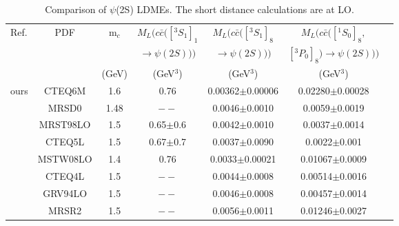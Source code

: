\documentclass[12pt,a4paper,final]{iopart}
\newcommand{\barc}{{\bar{c}}}
\begin{document}
\begin{table}[h]
\caption{Comparison of $\psi$(2S) LDMEs. The short distance calculations are at LO. }
\begin{tabular}{|l|c|c|c|c|c|c|}
\hline            
Ref.       &PDF     &m$_{c}$  &$M_{L}(c\barc([^3S_1]_{1}$      &$M_{L}(c\barc([^3S_1]_{8}$    &$M_{L}(c\barc([^1S_0]_{8},$ \\
           &        &        &$\rightarrow \psi(2S)))$      &$\rightarrow \psi(2S)))$    &$[^3P_0]_{8})\rightarrow \psi(2S)))$   \\
           &        &(GeV)   &(GeV$^{3}$)                    &(GeV$^3$)                   &(GeV$^3$)                            \\ 
\hline
ours                            &CTEQ6M   &1.6     &0.76           &0.00362$\pm$0.00006 &0.02280$\pm$0.00028                                \\
\cite{Cho:1995vh}               &MRSD0    &1.48    &$--$           &0.0046$\pm$0.0010   &0.0059$\pm$0.0019                                 \\
\cite{Braaten:1999qk}           &MRST98LO &1.5     &0.65$\pm$0.6   &0.0042$\pm$0.0010   &0.0037$\pm$0.0014                                 \\
\cite{Braaten:1999qk}           &CTEQ5L   &1.5     &0.67$\pm$0.7   &0.0037$\pm$0.0090   &0.0022$\pm$0.001                                  \\
\cite{Sharma:2012dy}            &MSTW08LO &1.4     &0.76           &0.0033$\pm$0.00021  &0.01067$\pm$0.0009                               \\
\cite{Beneke:1996yw}            &CTEQ4L   &1.5     &$--$           &0.0044$\pm$0.0008   &0.00514$\pm$0.0016                               \\
\cite{Beneke:1996yw}            &GRV94LO  &1.5     &$--$           &0.0046$\pm$0.0008   &0.00457$\pm$0.0014                                \\
\cite{Beneke:1996yw}            &MRSR2    &1.5     &$--$           &0.0056$\pm$0.0011   &0.01246$\pm$0.0027                                \\
\hline
\end{tabular}
\label{table:LDMEPsi2S}
\end{table}
\end{document}
